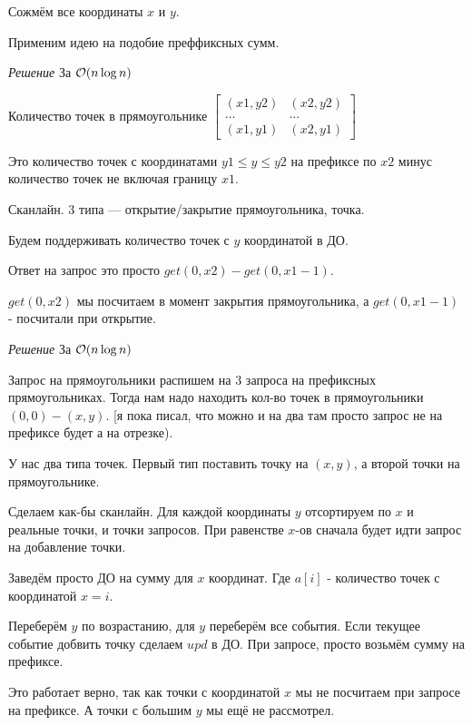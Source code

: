 Сожмём все координаты $x$ и $y$.

Применим идею на подобие преффиксных сумм.

\down
\down

{\it Решение } За $\mathcal{O}(n \log n)$

Количество точек в прямоугольнике $\begin{bmatrix}

(x1, y2) & (x2, y2)\\

\ldots   & \ldots\\

(x1, y1) & (x2, y1)

\end{bmatrix}$ 

Это количество точек с координатами $y1 \le y \le y2$ на префиксе по $x2$ минус количество точек не включая границу $x1$.

Сканлайн. 3 типа --- открытие/закрытие прямоугольника, точка.

Будем поддерживать количество точек с $y$ координатой в ДО.

Ответ на запрос это просто $get(0, x2) - get(0, x1 - 1)$.

$get(0, x2)$ мы посчитаем в момент закрытия прямоугольника, а $get(0, x1 - 1)$  - посчитали при открытие.

\down

{\it Решение } За $\mathcal{O}(n \log n)$

Запрос на прямоугольники распишем на $3$ запроса на префиксных прямоугольниках. Тогда нам надо находить кол-во точек в прямоугольники $(0, 0)-(x, y)$. [я пока писал, что можно и на два там просто запрос не на префиксе будет а на отрезке).

У нас два типа точек. Первый тип поставить точку на $(x, y)$, а второй точки на прямоугольнике.

Сделаем как-бы сканлайн. Для каждой координаты $y$ отсортируем по $x$ и реальные точки, и точки запросов. При равенстве $x$-ов сначала будет идти запрос на добавление точки.

Заведём просто ДО на сумму для $x$ координат. Где $a[i]$ - количество точек с координатой $x=i$.

Переберём $y$ по возрастанию, для $y$ переберём все события. Если текущее событие добвить точку сделаем $upd$ в ДО. При запросе, просто возьмём сумму на префиксе.

Это работает верно, так как точки с координатой $x$ мы не посчитаем при запросе на префиксе.
А точки с большим $y$ мы ещё не рассмотрел.

